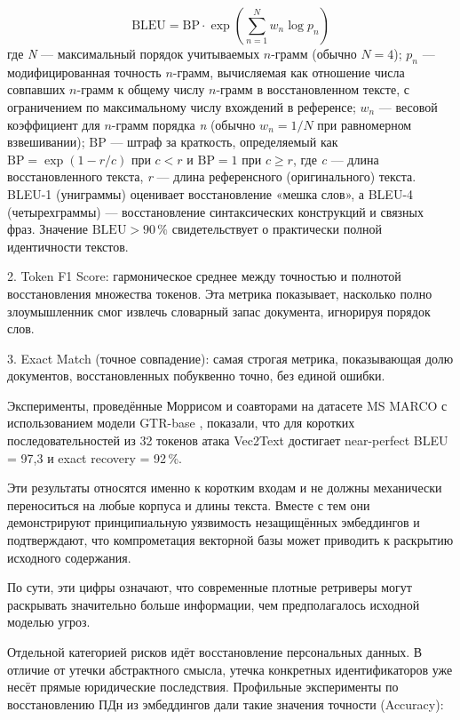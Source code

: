 \documentclass[a4paper, 12pt, oneside, openany]{article}
\begin{document}
\begin{equation}
	\mathrm{BLEU} = \mathrm{BP} \cdot \exp\!\left( \sum_{n=1}^{N} w_{n} \log p_{n} \right)
	\label{eq:1-9}
\end{equation}
где \emph{N} --- максимальный порядок учитываемых $n$-грамм (обычно $N = 4$); \(p_{n}\) --- модифицированная точность $n$-грамм, вычисляемая как отношение числа совпавших $n$-грамм к общему числу $n$-грамм в восстановленном тексте, с ограничением по максимальному числу вхождений в референсе; \(w_{n}\) --- весовой коэффициент для $n$-грамм порядка \emph{n} (обычно \(w_{n} = 1/N\) при равномерном взвешивании); \(\mathrm{BP}\) --- штраф за краткость, определяемый как $\mathrm{BP} = \exp(1 - r/c)$ при $c < r$ и $\mathrm{BP} = 1$ при $c \geq r$, где \emph{c} --- длина восстановленного текста, \emph{r} --- длина референсного (оригинального) текста. BLEU-1 (униграммы) оценивает восстановление «мешка слов», а BLEU-4 (четырехграммы) --- восстановление синтаксических конструкций и связных фраз. Значение $\mathrm{BLEU} > 90\,\%$ свидетельствует о практически полной идентичности текстов.

2. Token F1 Score: гармоническое среднее между точностью и полнотой восстановления множества токенов. Эта метрика показывает, насколько полно злоумышленник смог извлечь словарный запас документа, игнорируя порядок слов.

3. Exact Match (точное совпадение): самая строгая метрика, показывающая долю документов, восстановленных побуквенно точно, без единой ошибки.

Эксперименты, проведённые Моррисом и соавторами на датасете MS MARCO с использованием модели GTR-base \cite{ref5}, показали, что для коротких последовательностей из 32 токенов атака Vec2Text достигает near-perfect BLEU = 97{,}3 и exact recovery = 92\,\%.

Эти результаты относятся именно к коротким входам и не должны механически переноситься на любые корпуса и длины текста. Вместе с тем они демонстрируют принципиальную уязвимость незащищённых эмбеддингов и подтверждают, что компрометация векторной базы может приводить к раскрытию исходного содержания.

По сути, эти цифры означают, что современные плотные ретриверы могут раскрывать значительно больше информации, чем предполагалось исходной моделью угроз.

Отдельной категорией рисков идёт восстановление персональных данных. В отличие от утечки абстрактного смысла, утечка конкретных идентификаторов уже несёт прямые юридические последствия. Профильные эксперименты по восстановлению ПДн из эмбеддингов дали такие значения точности (Accuracy):
\end{document}
